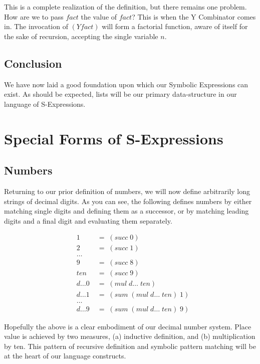 This is a complete realization of the definition, but there remains one problem. 
How are we to pass $fact$ the value of $fact$? This is when the Y Combinator comes 
in. The invocation of $(Y fact)$ will form a factorial function, aware of itself 
for the sake of recursion, accepting the single variable $n$.

\subsection{Conclusion}
We have now laid a good foundation upon which our Symbolic Expressions can exist. 
As should be expected, lists will be our primary data-structure in our language of 
S-Expressions.

\section{Special Forms of S-Expressions}
\subsection{Numbers}
Returning to our prior definition of numbers, we will now define arbitrarily long 
strings of decimal digits. As you can see, the following defines numbers by either 
matching single digits and defining them as a successor, or by matching leading 
digits and a final digit and evaluating them separately.

\begin{figure}[htp]
\caption{}\label{scheme}
\begin{align*}
& 1 \; &= \; (succ \; 0)
\\& 2 \; &= \; (succ \; 1)
\\& \dots
\\& 9 \; &= \; (succ \; 8)
\\& ten \; &= \; (succ \; 9)
\\& d\dots0 \; &= \; (mul \; d\dots \; ten)
\\& d\dots1 \; &= \; (sum \; (mul \; d\dots \; ten) \; 1)
\\& \dots
\\& d\dots9 \; &= \; (sum \; (mul \; d\dots \; ten) \; 9)
\end{align*}
\end{figure}

Hopefully the above is a clear embodiment of our decimal number system. Place 
value is achieved by two measures, (a) inductive definition, and (b) 
multiplication by ten. This pattern of recursive definition and symbolic pattern 
matching will be at the heart of our language constructs.

